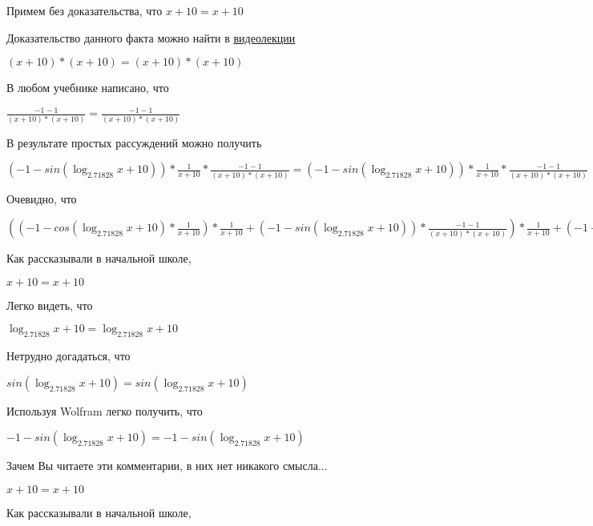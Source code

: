 \documentclass[12pt,a4paper,fleqn]{article}
\theoremstyle{definition}
\begin{document}
Примем без доказательства, что
$ x  +  10  =  x  +  10 $

Доказательство данного факта можно найти в \href{https://www.youtube.com/watch?v=dQw4w9WgXcQ}{видеолекции}

$( x  +  10 ) * ( x  +  10 ) = ( x  +  10 ) * ( x  +  10 )$

В любом учебнике написано, что

$\frac{ -1  -  1 }{( x  +  10 ) * ( x  +  10 )}
 = \frac{ -1  -  1 }{( x  +  10 ) * ( x  +  10 )}
$

В результате простых рассуждений можно получить

$( -1  - sin(\log_{ 2.71828 }{ x  +  10 })) * \frac{ 1 }{ x  +  10 }
 * \frac{ -1  -  1 }{( x  +  10 ) * ( x  +  10 )}
 = ( -1  - sin(\log_{ 2.71828 }{ x  +  10 })) * \frac{ 1 }{ x  +  10 }
 * \frac{ -1  -  1 }{( x  +  10 ) * ( x  +  10 )}
$

Очевидно, что

$(( -1  - cos(\log_{ 2.71828 }{ x  +  10 }) * \frac{ 1 }{ x  +  10 }
) * \frac{ 1 }{ x  +  10 }
 + ( -1  - sin(\log_{ 2.71828 }{ x  +  10 })) * \frac{ -1  -  1 }{( x  +  10 ) * ( x  +  10 )}
) * \frac{ 1 }{ x  +  10 }
 + ( -1  - sin(\log_{ 2.71828 }{ x  +  10 })) * \frac{ 1 }{ x  +  10 }
 * \frac{ -1  -  1 }{( x  +  10 ) * ( x  +  10 )}
 = (( -1  - cos(\log_{ 2.71828 }{ x  +  10 }) * \frac{ 1 }{ x  +  10 }
) * \frac{ 1 }{ x  +  10 }
 + ( -1  - sin(\log_{ 2.71828 }{ x  +  10 })) * \frac{ -1  -  1 }{( x  +  10 ) * ( x  +  10 )}
) * \frac{ 1 }{ x  +  10 }
 + ( -1  - sin(\log_{ 2.71828 }{ x  +  10 })) * \frac{ 1 }{ x  +  10 }
 * \frac{ -1  -  1 }{( x  +  10 ) * ( x  +  10 )}
$

Как рассказывали в начальной школе,

$ x  +  10  =  x  +  10 $

Легко видеть, что

$\log_{ 2.71828 }{ x  +  10 } = \log_{ 2.71828 }{ x  +  10 }$

Нетрудно догадаться, что

$sin(\log_{ 2.71828 }{ x  +  10 }) = sin(\log_{ 2.71828 }{ x  +  10 })$

Используя Wolfram легко получить, что

$ -1  - sin(\log_{ 2.71828 }{ x  +  10 }) =  -1  - sin(\log_{ 2.71828 }{ x  +  10 })$

Зачем Вы читаете эти комментарии, в них нет никакого смысла...

$ x  +  10  =  x  +  10 $

Как рассказывали в начальной школе,
\end{document}

